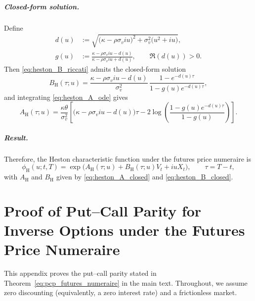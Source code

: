 \documentclass[a4paper,titlepage,12pt]{report}
\theoremstyle{plain}
\begin{document}
\paragraph{Closed-form solution.}
Define
\begin{align}
d(u) &:= \sqrt{\big(\kappa-\rho\sigma_v i u\big)^2 + \sigma_v^2\big(u^2+i u\big)}, \\
g(u) &:= \frac{\kappa-\rho\sigma_v i u - d(u)}{\kappa-\rho\sigma_v i u + d(u)},
\qquad \Re(d(u))>0.
\end{align}
Then \eqref{eq:heston_B_riccati} admits the closed-form solution \citep{Heston1993}
\begin{equation}
\boxed{
B_{\mathrm{H}}(\tau;u)
=
\frac{\kappa-\rho\sigma_v i u - d(u)}{\sigma_v^2}\,
\frac{1-e^{-d(u)\tau}}{1-g(u)e^{-d(u)\tau}},}
\label{eq:heston_B_closed}
\end{equation}
and integrating \eqref{eq:heston_A_ode} gives \citep{Heston1993}
\begin{equation}
\boxed{
A_{\mathrm{H}}(\tau;u)
=
\frac{\kappa\theta}{\sigma_v^2}
\left[
\big(\kappa-\rho\sigma_v i u - d(u)\big)\tau
-
2\log\!\left(\frac{1-g(u)e^{-d(u)\tau}}{1-g(u)}\right)
\right].}
\label{eq:heston_A_closed}
\end{equation}

\paragraph{Result.}
Therefore, the Heston characteristic function under the futures price numeraire is
\begin{equation}
\boxed{
\phi_{\mathrm{H}}(u;t,T)
=
\exp\!\big(A_{\mathrm{H}}(\tau;u)+B_{\mathrm{H}}(\tau;u)V_t+iuX_t\big),
\qquad \tau=T-t,
}
\label{eq:heston_cf_boxed}
\end{equation}
with $A_{\mathrm{H}}$ and $B_{\mathrm{H}}$ given by \eqref{eq:heston_A_closed} and
\eqref{eq:heston_B_closed}.

\newpage

\chapter{Proof of Put--Call Parity for Inverse Options under the Futures Price Numeraire}
\label{app:pcp_futures_numeraire}
\setcounter{equation}{0}
\renewcommand{\theequation}{C.\arabic{equation}}

\noindent
This appendix proves the put--call parity stated in Theorem~\ref{eq:pcp_futures_numeraire} in the main
text. Throughout, we assume zero discounting (equivalently, a zero interest rate) and a frictionless
market.
\end{document}

